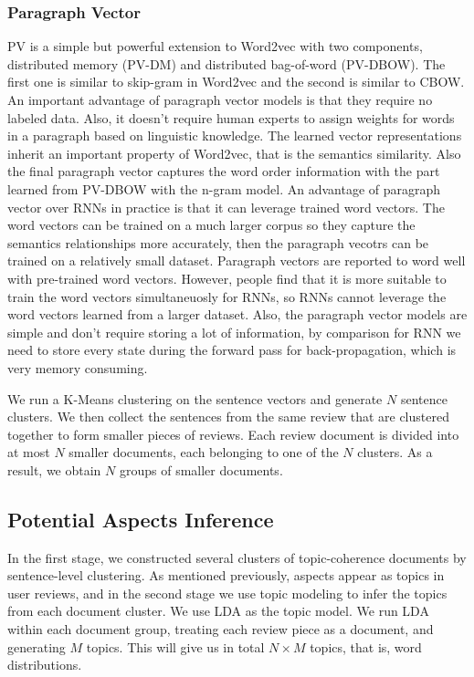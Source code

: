 \subsubsection{Paragraph Vector}
PV is a simple but powerful extension to Word2vec \cite{mikolov2013distributed} with two components, 
distributed memory (PV-DM) and distributed bag-of-word (PV-DBOW). 
The first one is similar to skip-gram in Word2vec and the second is similar to CBOW.
An important advantage of paragraph vector models is that they require 
no labeled data. Also, it doesn't require human experts to assign weights 
for words in a paragraph based on linguistic knowledge. 
The learned vector representations inherit an important property of Word2vec, 
that is the semantics similarity. Also the final paragraph vector captures the 
word order information with the part learned from PV-DBOW with the n-gram model.
An advantage of paragraph vector over RNNs in practice is that it can 
leverage trained word vectors. The word vectors can be trained on 
a much larger corpus so they capture the semantics relationships more accurately, 
then the paragraph vecotrs can be trained on a relatively small dataset. 
Paragraph vectors are reported to word well with pre-trained word vectors. 
However, people find that it is more suitable to train the word vectors 
simultaneuosly for RNNs, so RNNs cannot leverage the word vectors learned 
from a larger dataset. Also, the paragraph vector models are simple and 
don't require storing a lot of information, by comparison for RNN we 
need to store every state during the forward pass for back-propagation, 
which is very memory consuming.

We run a K-Means clustering on the sentence vectors and generate 
$N$ sentence clusters. We then collect the sentences from the same review 
that are clustered together to form smaller pieces of reviews. 
Each review document is divided into at most $N$ smaller documents, each belonging
to one of the $N$ clusters. As a result, we obtain $N$ groups of 
smaller documents.

\subsection{Potential Aspects Inference}
In the first stage, we constructed several clusters of 
topic-coherence documents by sentence-level clustering.
As mentioned previously, aspects appear as topics in user reviews, 
and in the second stage
we use topic modeling to infer the topics from each document cluster.
We use LDA \cite{blei2003latent} as the topic model. We run LDA within each document group, 
treating each review piece as a document, and generating $M$ topics. 
This will give us in total $N\times M$ topics, that is, word distributions. 

